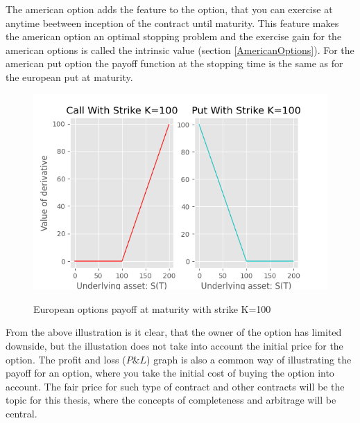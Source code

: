 The american option adds the feature to the option, that you can exercise at anytime beetween inception of the contract until maturity. This feature makes the american option an optimal stopping problem and the exercise gain for the american options is called the intrinsic value (section \ref{AmericanOptions}). For the american put option the payoff function at the stopping time is the same as for the european put at maturity. 

\begin{figure}[H]
\centering
\includegraphics{Figures/contractfct.png}\\
\decoRule
\caption[Contract Functions]{European options payoff at maturity with strike K=100}
\label{fig:contractfct}
\end{figure}

From the above illustration is it clear, that the owner of the option has limited downside, but the illustation does not take into account the initial price for the option. The profit and loss ($P\& L$) graph is also a common way of illustrating the payoff for an option, where you take the initial cost of buying the option into account. The fair price for such type of contract and other contracts will be the topic for this thesis, where the concepts of completeness and arbitrage will be central.


